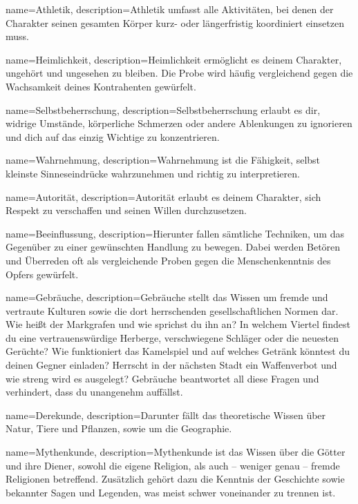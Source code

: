{
    name={Athletik},
    description={Athletik umfasst alle Aktivitäten, bei denen der Charakter seinen gesamten Körper kurz- oder längerfristig koordiniert einsetzen muss.}
}


{
    name={Heimlichkeit},
    description={Heimlichkeit ermöglicht es deinem Charakter, ungehört und ungesehen zu bleiben. Die Probe wird häufig vergleichend gegen die Wachsamkeit deines Kontrahenten gewürfelt.}
}


{
    name={Selbstbeherrschung},
    description={Selbstbeherrschung erlaubt es dir, widrige Umstände, körperliche Schmerzen oder andere Ablenkungen zu ignorieren und dich auf das einzig Wichtige zu konzentrieren.}
}


{
    name={Wahrnehmung},
    description={Wahrnehmung ist die Fähigkeit, selbst kleinste Sinneseindrücke wahrzunehmen und richtig zu interpretieren.}
}


{
    name={Autorität},
    description={Autorität erlaubt es deinem Charakter, sich Respekt zu verschaffen und seinen Willen durchzusetzen.}
}


{
    name={Beeinflussung},
    description={Hierunter fallen sämtliche Techniken, um das Gegenüber zu einer gewünschten Handlung zu bewegen. Dabei werden Betören und Überreden oft als vergleichende Proben gegen die Menschenkenntnis des Opfers gewürfelt.}
}


{
    name={Gebräuche},
    description={Gebräuche stellt das Wissen um fremde und vertraute Kulturen sowie die dort herrschenden gesellschaftlichen Normen dar. Wie heißt der Markgrafen und wie sprichst du ihn an? In welchem Viertel findest du eine vertrauenswürdige Herberge, verschwiegene Schläger oder die neuesten Gerüchte? Wie funktioniert das Kamelspiel und auf welches Getränk könntest du deinen Gegner einladen? Herrscht in der nächsten Stadt ein Waffenverbot und wie streng wird es ausgelegt? Gebräuche beantwortet all diese Fragen und verhindert, dass du unangenehm auffällst.}
}


{
    name={Derekunde},
    description={Darunter fällt das theoretische Wissen über Natur, Tiere und Pflanzen, sowie um die Geographie.}
}


{
    name={Mythenkunde},
    description={Mythenkunde ist das Wissen über die Götter und ihre Diener, sowohl die eigene Religion, als auch – weniger genau – fremde Religionen betreffend. Zusätzlich gehört dazu die Kenntnis der Geschichte sowie bekannter Sagen und Legenden, was meist schwer voneinander zu trennen ist.}
}


